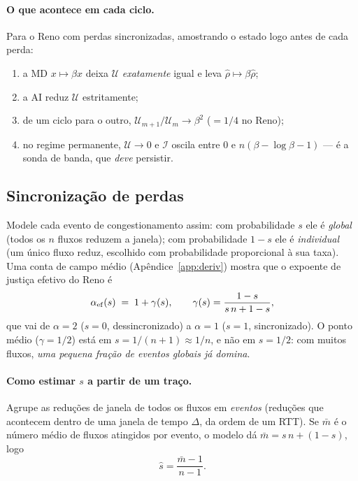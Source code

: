 \documentclass[11pt,a4paper]{article}
\begin{document}
\paragraph{O que acontece em cada ciclo.} Para o Reno com perdas sincronizadas, amostrando
o estado logo antes de cada perda:
\begin{enumerate}[label=(\roman*)]
\item a MD $x\mapsto\beta x$ deixa $\mathcal U$ \emph{exatamente} igual e leva
$\hat\rho\mapsto\beta\hat\rho$;
\item a AI reduz $\mathcal U$ estritamente;
\item de um ciclo para o outro, $\mathcal U_{m+1}/\mathcal U_m\to\beta^2$
($=1/4$ no Reno);
\item no regime permanente, $\mathcal U\to0$ e $\mathcal I$ oscila entre $0$ e
$n(\beta-\log\beta-1)$ --- é a sonda de banda, que \emph{deve} persistir.
\end{enumerate}

\subsection{Sincronização de perdas}
\label{app:sync}

Modele cada evento de congestionamento assim: com probabilidade $s$ ele é
\emph{global} (todos os $n$ fluxos reduzem a janela); com probabilidade $1-s$ ele é
\emph{individual} (um único fluxo reduz, escolhido com probabilidade proporcional à sua
taxa). Uma conta de campo médio (Apêndice~\ref{app:deriv}) mostra que o expoente de
justiça efetivo do Reno é
\begin{equation}
\alpha_{\rm ef}(s)\;=\;1+\gamma(s),\qquad
\gamma(s)=\frac{1-s}{s\,n+1-s},
\label{eq:interpA}
\end{equation}
que vai de $\alpha=2$ ($s=0$, dessincronizado) a $\alpha=1$ ($s=1$, sincronizado). O
ponto médio ($\gamma=1/2$) está em $s=1/(n+1)\approx1/n$, e não em $s=1/2$: com muitos
fluxos, \emph{uma pequena fração de eventos globais já domina}.

\paragraph{Como estimar $s$ a partir de um traço.} Agrupe as reduções de janela de todos
os fluxos em \emph{eventos} (reduções que acontecem dentro de uma janela de tempo
$\Delta$, da ordem de um RTT). Se $\bar m$ é o número médio de fluxos atingidos por
evento, o modelo dá $\bar m=s\,n+(1-s)$, logo
\begin{equation}
\hat s=\frac{\bar m-1}{n-1}.
\label{eq:shatA}
\end{equation}
\end{document}

